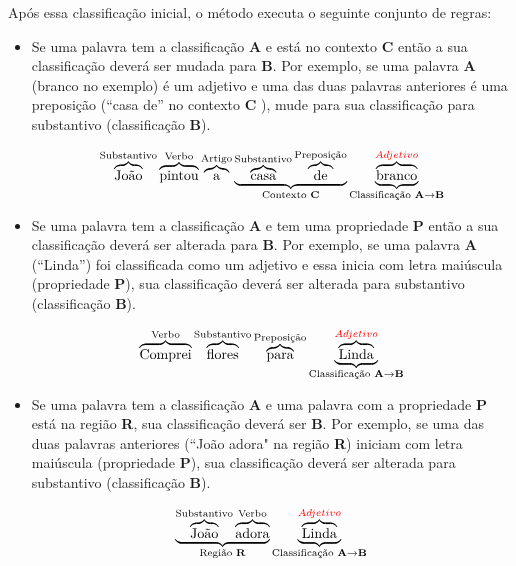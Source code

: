 Após essa classificação inicial, o método executa o seguinte conjunto de regras:
\newpage
\begin{itemize}
   \item Se uma palavra tem a classificação \textbf{A} e está no contexto
  \textbf{C} então a sua classificação deverá ser mudada para \textbf{B}. Por
  exemplo, se uma palavra \textbf{A} (branco no exemplo) é um adjetivo e uma das
  duas palavras anteriores é uma preposição (``casa de'' no contexto \textbf{C}
  ), mude para sua classificação para substantivo (classificação \textbf{B}).
  
  \[\overbrace{\text{João}}^\text{Substantivo}
  \overbrace{\text{pintou}}^\text{Verbo}
  \overbrace{\text{a}}^\text{Artigo}
  \underbrace{
  \overbrace{\text{casa}}^\text{Substantivo}
  \overbrace{\text{de}}^\text{Preposição}}_\text{Contexto \textbf{C}}
  \underbrace{\overbrace{\text{branco}}^{\textcolor{red}{Adjetivo}}}_\text{Classificação
  \textbf{A}\textrightarrow\textbf{B}}
 \]
 
  \item Se uma palavra tem a classificação \textbf{A} e tem uma propriedade
  \textbf{P} então a sua classificação deverá ser alterada para \textbf{B}. Por
  exemplo, se uma palavra \textbf{A} (``Linda'') foi classificada como um
  adjetivo e essa inicia com letra maiúscula (propriedade \textbf{P}), sua classificação deverá ser
  alterada para substantivo (classificação \textbf{B}).
  
  \[\overbrace{\text{Comprei}}^\text{Verbo}
  \overbrace{\text{flores}}^\text{Substantivo}
  \overbrace{\text{para}}^\text{Preposição}
  \underbrace{\overbrace{\text{L}\text{inda}}^{\textcolor{red}{Adjetivo}}}_\text{Classificação
  \textbf{A}\textrightarrow\textbf{B}}
 \]
 
  \item Se uma palavra tem a classificação \textbf{A} e uma palavra com a
  propriedade \textbf{P} está na região \textbf{R}, sua classificação deverá
  ser \textbf{B}. Por exemplo, se uma das duas palavras anteriores (``João
  adora" na região \textbf{R}) iniciam com letra maiúscula (propriedade
  \textbf{P}), sua classificação deverá ser alterada para substantivo (classificação \textbf{B}).
  
   \[\underbrace{\overbrace{\text{João}}^\text{Substantivo}
  \overbrace{\text{adora}}^\text{Verbo}}_\text{Região \textbf{R}}
  \underbrace{\overbrace{\text{L}\text{inda}}^{\textcolor{red}{Adjetivo}}}_\text{Classificação
  \textbf{A}\textrightarrow\textbf{B}}
 \]
 
  
\end{itemize}

